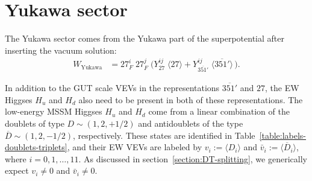 \documentclass[a4paper,12pt]{article}
\begin{document}
\section{Yukawa sector\label{section:Yukawa-sector}}

The Yukawa sector comes from the Yukawa part of the superpotential after inserting the vacuum solution:
\begin{align}
W_{\textrm{Yukawa}}&=27_F^i\;27_F^j\;\big(Y^{ij}_{27}\;\langle 27\rangle + Y_{\overline{351'}}^{ij}\;\langle \overline{351'}\rangle\,\big).
\end{align}

In addition to the GUT scale VEVs in the representations $\overline{351'}$ and $27$, the EW Higgses $H_u$ and $H_d$ also need to be present in both of these representations. The low-energy MSSM Higgses $H_u$ and $H_d$ come from a linear combination of the doublets of type $D\sim(1,2,+1/2)$ and antidoublets of the type $\overline{D}\sim(1,2,-1/2)$, respectively. These states are identified in Table~\ref{table:labels-doublets-triplets}, and their EW VEVs are labeled by $v_i:=\langle D_i\rangle$ and $\bar{v}_i:=\langle \overline{D}_i \rangle$, where $i=0,1,\ldots,11$. As discussed in section~\ref{section:DT-splitting}, we generically expect $v_i\neq 0$ and $\bar{v}_i\neq 0$.
\end{document}
